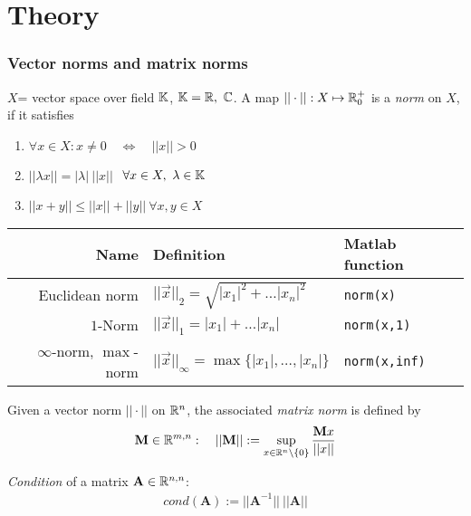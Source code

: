 \part{Theory}
	\section{Vector norms and matrix norms}
		\begin{definition}[Norm]
			$X$= vector space over field $\mathbb{K}$, $\mathbb{K} = \mathbb{R}, \ \mathbb{C}$. A map $|| \cdot ||: X \mapsto \mathbb{R}_0^+$ is a \emph{norm} on $X$, if it satisfies
			\begin{enumerate}
			 \item $\forall x \in X: x \neq 0	\quad \Longleftrightarrow \quad ||x|| > 0$
			 \item $||\lambda x|| = |\lambda| \ ||x||$ $\ \forall x \in X,\ \lambda \in \mathbb{K}$
			 \item $||x+y|| \leq ||x|| + ||y|| \ \forall x,y \in X$
			\end{enumerate}
		\end{definition}
		\begin{center}
			\begin{tabular}{rll}
			 Name			& Definition		& Matlab function\\ \hline
			 Euclidean norm & $||\vec x||_2 = \sqrt{|x_1|^2 + \ldots |x_n|^ 2}$ & \verb|norm(x)|\\
			 $1$-Norm		& $||\vec x||_1 = |x_1| + \ldots |x_n|$ & \verb|norm(x,1)|\\
			 $\infty$-norm, $\max$-norm& $||\vec x||_\infty = \max \{ |x_1|, \ldots, |x_n|\}$& \verb|norm(x,inf)|
			\end{tabular}
		\end{center}
		
		\begin{definition}
			Given a vector norm $|| \cdot ||$ on $\mathbb{R}^n$, the associated \emph{matrix norm} is defined by
			\begin{align*}
			 \mathbf M \in \mathbb{R}^{m,n}: \quad ||\mathbf M ||:= \sup_{x \in \mathbb{R}^n \setminus \{0\}} \frac{\mathbf M x}{||x||}
			\end{align*}
		\end{definition}
		
		\begin{definition}
		 \emph{Condition} of a matrix $\mathbf{A}\in \mathbb{R}^{n,n}$:
		 \begin{align*}
		  cond(\mathbf A) := ||\mathbf A^{-1}|| \ ||\mathbf A ||
		 \end{align*}
		\end{definition}
		
